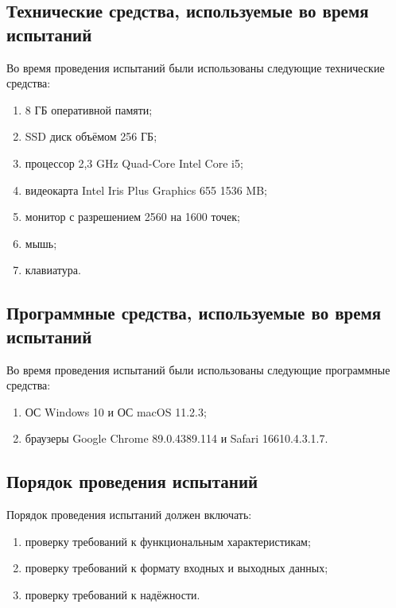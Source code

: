 \documentclass{../../includes/TechDocMultiAuthors}
\begin{document}
    \subsection{Технические средства, используемые во время испытаний}

    Во время проведения испытаний были использованы следующие технические средства:

    \begin{enumerate}
        \item 8 ГБ оперативной памяти;
        \item SSD диск объёмом 256 ГБ;
        \item процессор 2,3 GHz Quad-Core Intel Core i5;
        \item видеокарта Intel Iris Plus Graphics 655 1536 MB;
        \item монитор с разрешением 2560 на 1600 точек;
        \item мышь;
        \item клавиатура.
    \end{enumerate}

    \subsection{Программные средства, используемые во время испытаний}

    Во время проведения испытаний были использованы следующие программные средства:
    
    \begin{enumerate}
        \item ОС Windows 10 и ОС macOS 11.2.3;
        \item браузеры Google Chrome 89.0.4389.114 и Safari 16610.4.3.1.7.
    \end{enumerate}

    \subsection{Порядок проведения испытаний}

    Порядок проведения испытаний должен включать:

    \begin{enumerate}
        \item проверку требований к функциональным характеристикам;
        \item проверку требований к формату входных и выходных данных;
        \item проверку требований к надёжности.
    \end{enumerate}
\end{document}
